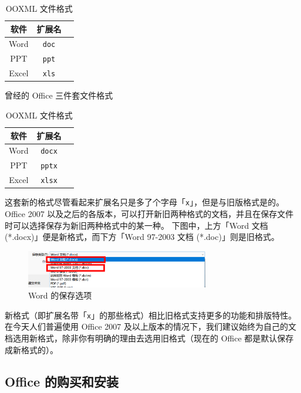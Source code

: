 \begin{table}[htb!]
  \begin{minipage}{7.5cm}
    \centering\begin{tabular}{ccc}
      \toprule
      软件 & 扩展名 \\
      \midrule
      Word & \verb|doc| \\
      PPT & \verb|ppt| \\
      Excel & \verb|xls| \\
      \bottomrule
    \end{tabular}
    \caption{曾经的 Office 三件套文件格式}
    \label{Old_Office_File_Format}
  \end{minipage}
  \begin{minipage}{6cm}
    \centering\begin{tabular}{ccc}
      \toprule
      软件 & 扩展名 \\
      \midrule
      Word & \verb|docx| \\
      PPT & \verb|pptx| \\
      Excel & \verb|xlsx| \\
      \bottomrule
    \end{tabular}
    \caption{OOXML 文件格式}
    \label{OOXML_File_Format}
  \end{minipage}
\end{table}

这套新的格式尽管看起来扩展名只是多了个字母「\verb|x|」，但是与旧版格式是的。
Office 2007 以及之后的各版本，可以打开新旧两种格式的文档，并且在保存文件时可以选择保存为新旧两种格式中的某一种。
下图中，上方「Word 文档 (*.docx)」便是新格式，而下方「Word 97-2003 文档 (*.doc)」则是旧格式。

\begin{figure}[htb!]
  \centering
  \includegraphics[width=8cm]{assets/Word_formats.png}
  \caption{Word 的保存选项}
  \label{Word_Formats}
\end{figure}

新格式（即扩展名带「\verb|x|」的那些格式）相比旧格式支持更多的功能和排版特性。
在今天人们普遍使用 Office 2007 及以上版本的情况下，我们建议始终为自己的文档选用新格式，除非你有明确的理由去选用旧格式（现在的 Office 都是默认保存成新格式的）。

\subsection{Office 的购买和安装}

